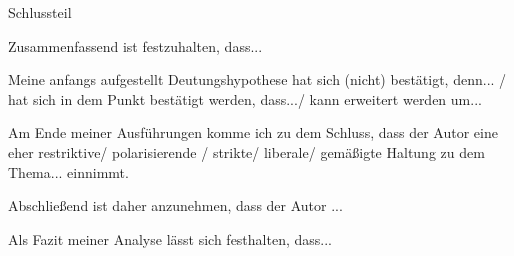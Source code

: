 Schlussteil
\begin{compactitem}
    \item Zusammenfassend ist festzuhalten, dass... 
    \item Meine anfangs aufgestellt Deutungshypothese hat sich (nicht) bestätigt, denn... / hat sich in dem Punkt bestätigt werden, dass.../ kann erweitert werden um... 
    \item Am Ende meiner Ausführungen komme ich zu dem Schluss, dass der Autor eine eher restriktive/ polarisierende / strikte/ liberale/ gemäßigte Haltung zu dem Thema... einnimmt. 
    \item Abschließend ist daher anzunehmen, dass der Autor ... 
    \item Als Fazit meiner Analyse lässt sich festhalten, dass... 
\end{compactitem}
